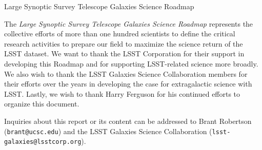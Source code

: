 \documentclass[11pt,fleqn,oneside,openany]{book}
\begin{document}




{\Huge Large Synoptic Survey Telescope} 
\linebreak 
\linebreak 
{\Huge Galaxies Science Roadmap}
\linebreak
\linebreak
{\centering

}
\vfill

\newpage
\thispagestyle{empty}

\noindent
{\justify
The {\it Large Synoptic Survey Telescope Galaxies Science Roadmap} represents the collective efforts of more than one hundred scientists to define the critical research activities to prepare our field to maximize
the science return of the LSST dataset. We want to thank the LSST Corporation for their
support in developing this Roadmap and for supporting LSST-related science more broadly.
We also wish to thank the LSST Galaxies Science Collaboration members for their efforts
over the years in developing the case for extragalactic science with LSST. Lastly, we
wish to thank Harry Ferguson for his continued efforts to organize this document.
}
\vspace{1in}

Inquiries about this report or its content can be addressed to Brant Robertson ({\tt brant@ucsc.edu}) and the LSST Galaxies Science Collaboration ({\tt lsst-galaxies@lsstcorp.org}).
\vspace{1in}







\tableofcontents %










\end{document}
